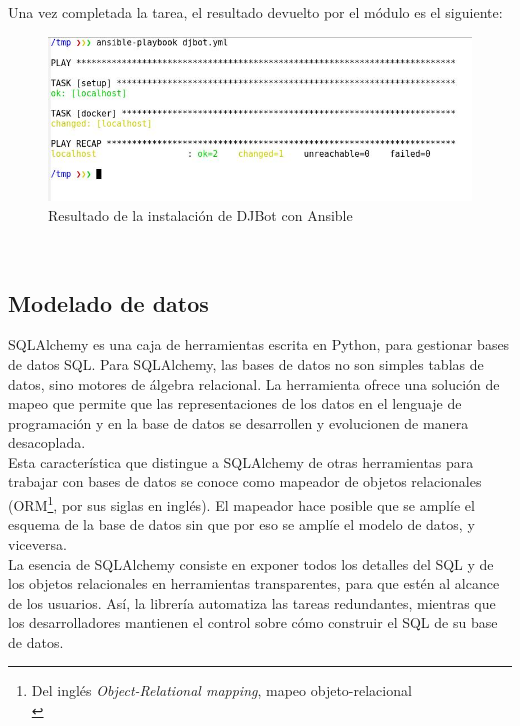 \documentclass[a4paper,12pt]{article}
\begin{document}
Una vez completada la tarea, el resultado devuelto por el módulo es el siguiente:\\

\begin{figure}[htb]
\centering
\includegraphics[width=.9\linewidth]{./img/ansible-djbot-execution.jpg}
\caption{Resultado de la instalación de DJBot con Ansible}
\end{figure}\\

\subsection{Modelado de datos}
\label{sec:orgheadline15}

SQLAlchemy es una caja de herramientas escrita en Python, para gestionar bases de datos SQL. Para SQLAlchemy, las bases de datos no son simples tablas de datos, sino motores de álgebra relacional. La herramienta ofrece una solución de mapeo que permite que las representaciones de los datos en el lenguaje de programación y en la base de datos se desarrollen y evolucionen de manera desacoplada.\\

Esta característica que distingue a SQLAlchemy de otras herramientas para trabajar con bases de datos se conoce como mapeador de objetos relacionales (ORM\footnote{Del inglés \emph{Object-Relational mapping}, mapeo objeto-relacional\\}, por sus siglas en inglés). El mapeador hace posible que se amplíe el esquema de la base de datos sin que por eso se amplíe el modelo de datos, y viceversa.\\

La esencia de SQLAlchemy consiste en exponer todos los detalles del SQL y de los objetos relacionales en herramientas transparentes, para que estén al alcance de los usuarios. Así, la librería automatiza las tareas redundantes, mientras que los desarrolladores mantienen el control sobre cómo construir el SQL de su base de datos.\\
\end{document}
